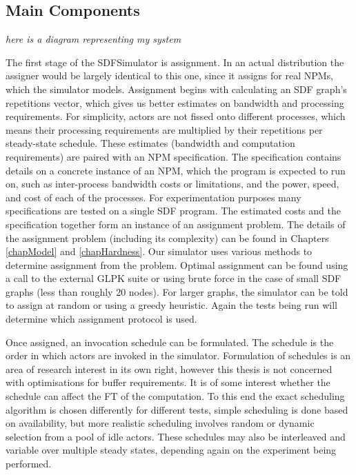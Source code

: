 \subsection{Main Components}
\label{secSystemComponents}

{\em here is a diagram representing my system}

The first stage of the SDFSimulator is assignment.
In an actual distribution the assigner would be largely identical to this one, since it assigns for real NPMs, which the simulator models.
Assignment begins with calculating an SDF graph's repetitions vector, which gives us better estimates on bandwidth and processing requirements.
For simplicity, actors are not fissed onto different processes, which means their processing requirements are multiplied by their repetitions per steady-state schedule.
These estimates (bandwidth and computation requirements) are paired with an NPM specification.
The specification contains details on a concrete instance of an NPM, which the program is expected to run on, such as inter-process bandwidth costs or limitations, and the power, speed, and cost of each of the processes.
For experimentation purposes many specifications are tested on a single SDF program.
The estimated costs and the specification together form an instance of an assignment problem.
The details of the assignment problem (including its complexity) can be found in Chapters \ref{chapModel} and \ref{chapHardness}.
Our simulator uses various methods to determine assignment from the problem.
Optimal assignment can be found using a call to the external GLPK suite or using brute force in the case of small SDF graphs (less than roughly 20 nodes).
For larger graphs, the simulator can be told to assign at random or using a greedy heuristic.
Again the tests being run will determine which assignment protocol is used.

Once assigned, an invocation schedule can be formulated.
The schedule is the order in which actors are invoked in the simulator.
Formulation of schedules is an area of research interest in its own right, however this thesis is not concerned with optimisations for buffer requirements.
It is of some interest whether the schedule can affect the FT of the computation.
To this end the exact scheduling algorithm is chosen differently for different tests, simple scheduling is done based on availability, but more realistic scheduling involves random or dynamic selection from a pool of idle actors.
These schedules may also be interleaved and variable over multiple steady states, depending again on the experiment being performed.

